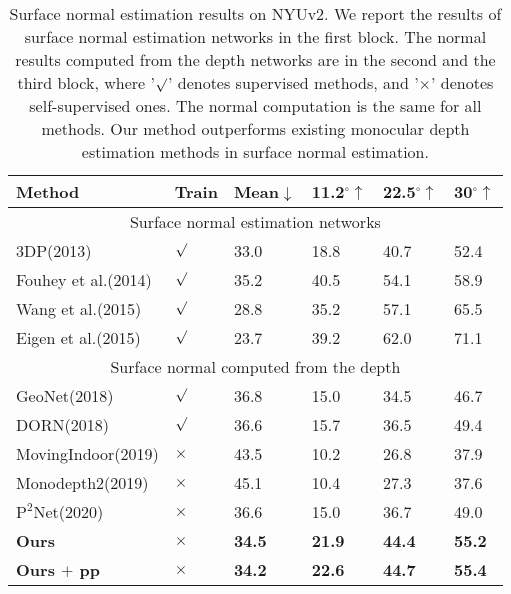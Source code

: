 \documentclass[10pt,twocolumn,letterpaper]{article}
\begin{document}
\begin{table}
\scriptsize
	\centering
	\begin{tabularx}{0.48\textwidth}{|l|X|X|XXX|}
		\hline
		Method & \multicolumn{1}{l|}{Train} & \multicolumn{1}{l|}{Mean$\downarrow$} & 11.2$^{\circ}\uparrow$ & 22.5$^{\circ}\uparrow$ & 30$^{\circ}\uparrow$ \\
		\hline\hline
		\multicolumn{6}{|c|}{Surface normal estimation networks} \\
		\hline
		3DP(2013)\cite{fouhey2013data}   & $\surd$& 33.0 & 18.8 & 40.7 & 52.4 \\ 
		Fouhey et al.(2014)\cite{fouhey2014unfolding} & $\surd$ & 35.2 & 40.5 & 54.1 & 58.9 \\
Wang et al.(2015)\cite{wang2015designing} & $\surd$ & 28.8  & 35.2 & 57.1  & 65.5 \\
		Eigen et al.(2015)\cite{eigen2015predicting} & $\surd$ & 23.7 & 39.2 & 62.0  & 71.1 \\
		\hline\hline
		\multicolumn{6}{|c|}{Surface normal computed from the depth} \\
		\hline
		GeoNet(2018)\cite{qi2018geonet} & $\surd$ & 36.8 & 15.0 & 34.5 & 46.7 \\
		DORN(2018)\cite{fu2018deep}  & $\surd$ & 36.6 & 15.7 & 36.5 & 49.4 \\
		\hline
		MovingIndoor(2019)\cite{zhou2019moving} & $\times$ & 43.5 & 10.2 & 26.8 & 37.9 \\
		Monodepth2(2019)\cite{godard2019digging} &$\times$ & 45.1 & 10.4 & 27.3 & 37.6 \\
		$\mathrm{P}^{2}\mathrm{Net}$(2020)\cite{yu2020p} & $\times$ & 36.6 & 15.0 & 36.7 & 49.0 \\
\textbf{Ours} & $\times$ & \textbf{34.5}  & \textbf{21.9}  & \textbf{44.4}  & \textbf{55.2} \\
\textbf{Ours $+$ pp} & $\times$ & \textbf{34.2}  & \textbf{22.6}  & \textbf{44.7}  & \textbf{55.4} \\
		\hline
\end{tabularx}
	\newline
	\caption{Surface normal estimation results on NYUv2. We report the results of surface normal estimation networks in the first block. The normal results computed from the depth networks are in the second and the third block, where '$\surd$' denotes supervised methods, and '$\times$' denotes self-supervised ones. 
		The normal computation is the same for all methods.  Our method outperforms existing monocular depth estimation methods in surface normal estimation.}
	\label{tab:nyuv2 norm}
\end{table}
\end{document}
